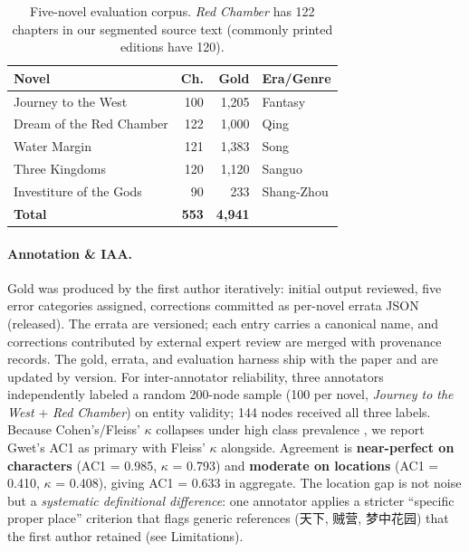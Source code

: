 \documentclass[11pt]{article}
\newenvironment{CJK}[2]{}{}
\begin{document}
\begin{table}[h]
\centering
\scriptsize
\setlength{\tabcolsep}{4pt}
\begin{tabular}{lrrl}
\toprule
\textbf{Novel} & \textbf{Ch.} & \textbf{Gold} & \textbf{Era/Genre} \\
\midrule
Journey to the West & 100 & 1{,}205 & Fantasy \\
Dream of the Red Chamber & 122 & 1{,}000 & Qing \\
Water Margin & 121 & 1{,}383 & Song \\
Three Kingdoms & 120 & 1{,}120 & Sanguo \\
Investiture of the Gods & 90 & 233 & Shang-Zhou \\
\midrule
\textbf{Total} & \textbf{553} & \textbf{4{,}941} & \\
\bottomrule
\end{tabular}
\caption{Five-novel evaluation corpus. \textit{Red Chamber} has 122 chapters in our segmented source text (commonly printed editions have 120).}
\label{tab:data}
\end{table}

\paragraph{Annotation \& IAA.} Gold was produced by the first author iteratively: initial output reviewed, five error categories assigned, corrections committed as per-novel errata JSON (released). The errata are versioned; each entry carries a canonical name, and corrections contributed by external expert review are merged with provenance records. The gold, errata, and evaluation harness ship with the paper and are updated by version. For inter-annotator reliability, three annotators independently labeled a random 200-node sample (100 per novel, \textit{Journey to the West} + \textit{Red Chamber}) on entity validity; 144 nodes received all three labels. Because Cohen's/Fleiss' $\kappa$ collapses under high class prevalence \cite{byrt1993bias,gwet2008kappa}, we report Gwet's AC1 as primary with Fleiss' $\kappa$ alongside. Agreement is \textbf{near-perfect on characters} (AC1 = 0.985, $\kappa$ = 0.793) and \textbf{moderate on locations} (AC1 = 0.410, $\kappa$ = 0.408), giving AC1 = 0.633 in aggregate. The location gap is not noise but a \emph{systematic definitional difference}: one annotator applies a stricter ``specific proper place'' criterion that flags generic references (\begin{CJK}{UTF8}{gbsn}天下\end{CJK}, \begin{CJK}{UTF8}{gbsn}贼营\end{CJK}, \begin{CJK}{UTF8}{gbsn}梦中花园\end{CJK}) that the first author retained (see Limitations).
\end{document}
